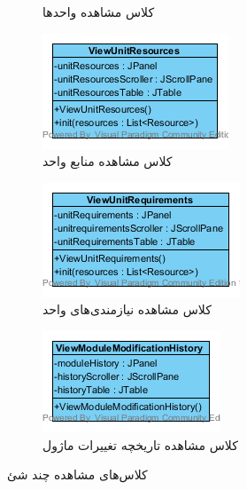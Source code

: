\begin{figure}[H]
\begin{subfigure}[b]{0.3\textwidth}
		\caption{کلاس مشاهده واحدها}
	\end{subfigure}
	\hfill
	\begin{subfigure}[b]{0.3\textwidth}
		\includegraphics[width=\textwidth]{img/class-design/ui/ViewUnitResources.png}
		\caption{کلاس مشاهده منابع واحد}
	\end{subfigure}
	\hfill
	\begin{subfigure}[b]{0.3\textwidth}
		\includegraphics[width=\textwidth]{img/class-design/ui/ViewUnitRequirements.png}
		\caption{کلاس مشاهده نیازمندی‌های واحد}
	\end{subfigure}
	\hfill
	\begin{subfigure}[b]{0.3\textwidth}
		\includegraphics[width=\textwidth]{img/class-design/ui/ViewModuleModificationHistory.png}
		\caption{کلاس مشاهده تاریخچه تغییرات ماژول}
	\end{subfigure}
	\caption{کلاس‌های مشاهده چند شئ}
\end{figure}

